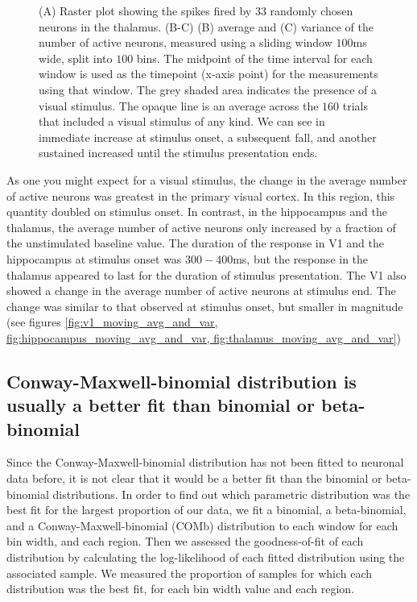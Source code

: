 \begin{figure}[p]
      \caption{(A) Raster plot showing the spikes fired by $33$ randomly chosen neurons in the thalamus. (B-C) (B) average and (C) variance of the number of active neurons, measured using a sliding window $100$ms wide, split into $100$ bins. The midpoint of the time interval for each window is used as the timepoint (x-axis point) for the measurements using that window. The grey shaded area indicates the presence of a visual stimulus. The opaque line is an average across the $160$ trials that included a visual stimulus of any kind. We can see in immediate increase at stimulus onset, a subsequent fall, and another sustained increased until the stimulus presentation ends.}
      \label{fig:thalamus_moving_avg_and_var}
    \end{figure}

    As one you might expect for a visual stimulus, the change in the average number of active neurons was greatest in the primary visual cortex. In this region, this quantity doubled on stimulus onset. In contrast, in the hippocampus and the thalamus, the average number of active neurons only increased by a fraction of the unstimulated baseline value. The duration of the response in V1 and the hippocampus at stimulus onset was $300-400$ms, but the response in the thalamus appeared to last for the duration of stimulus presentation. The V1 also showed a change in the average number of active neurons at stimulus end. The change was similar to that observed at stimulus onset, but smaller in magnitude (see figures \ref{fig:v1_moving_avg_and_var, fig:hippocampus_moving_avg_and_var, fig:thalamus_moving_avg_and_var})

  \subsection{Conway-Maxwell-binomial distribution is usually a better fit than binomial or beta-binomial}
  Since the Conway-Maxwell-binomial distribution has not been fitted to neuronal data before, it is not clear that it would be a better fit than the binomial or beta-binomial distributions. In order to find out which parametric distribution was the best fit for the largest proportion of our data, we fit a binomial, a beta-binomial, and a Conway-Maxwell-binomial (COMb) distribution to each window for each bin width, and each region. Then we assessed the goodness-of-fit of each distribution by calculating the log-likelihood of each fitted distribution using the associated sample. We measured the proportion of samples for which each distribution was the best fit, for each bin width value and each region.


